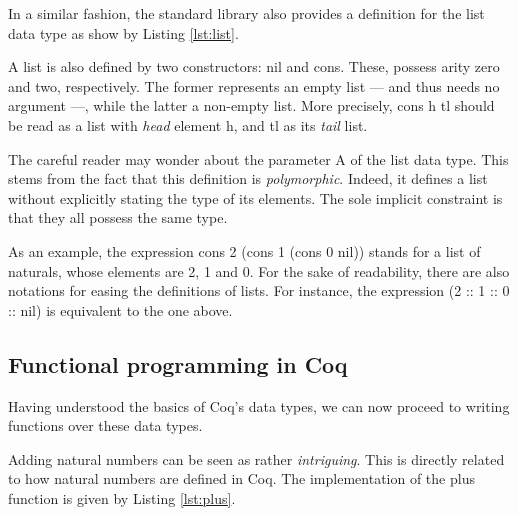 			
	
	In a similar fashion, the standard library also provides a definition for the list data type
	as show by Listing \ref{lst:list}.
	
	

	\noindent A \textsf{list} is also defined by two constructors: \textsf{nil} and \textsf{cons}. These,
	possess arity zero and two, respectively.
	The former represents an empty list --- and thus needs no argument ---, 
	while the latter a non-empty list. More precisely, \textsf{cons h tl} should be read
	as a \textsf{list} with \textit{head} element \textsf{h}, 
	and \textsf{tl} as its \textit{tail} \textsf{list}.
	
	The careful reader may wonder about the parameter \textsf{A} of the \textsf{list} data type. This
	stems from the fact that this definition is \textit{polymorphic}. Indeed, it defines a list without 
	explicitly stating the type of its elements. The sole implicit constraint is that they all possess
	the same type.
	
		As an example, the expression \textsf{cons 2 (cons 1 (cons 0 nil))} stands for a list
	of naturals, whose elements are 2, 1 and 0. For the sake of readability, there are also
	notations for easing the definitions of lists. For instance, the expression \textsf{(2 :: 1 :: 0 :: nil)} is
	equivalent to the one above.	


\subsection{Functional programming in Coq}
\label{sub:fpcoq}

	Having understood the basics of Coq's data types, we can now proceed to writing functions over
	these data types. 
	
	Adding natural numbers can be seen as rather \textit{intriguing}. This is directly
	related to how natural numbers are defined in Coq. The implementation of 
	the \textsf{plus} function is given by Listing \ref{lst:plus}.
	
			
	
